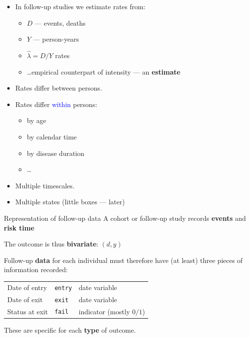 

\begin{frame}[fragile]%
  \begin{itemize}[<+->]
  \item In follow-up studies we estimate rates from:

    \begin{itemize}[<+->]
    \item $D$ --- events, deaths
    \item $Y$ --- person-years
    \item $\hat\lambda = D/Y$ rates
    \item \ldots empirical counterpart of intensity --- an \textbf{estimate}
    \end{itemize}

  \item Rates differ between persons.
  \item Rates differ \textcolor{blue}{within} persons:

    \begin{itemize}[<+->]
    \item by age
    \item by calendar time
    \item by disease duration
    \item \ldots
    \end{itemize}

  \item Multiple timescales.
  \item Multiple states (little boxes --- later)
  \end{itemize}

\end{frame}

\begin{frame}[fragile]{Representation of follow-up data}
A cohort or follow-up study records
\textbf{events} and \textbf{risk time}

The outcome is thus \textbf{bivariate}: $(d,y)$

Follow-up \textbf{data} for each individual must therefore have (at
least) three pieces of information recorded:
\begin{center}
\begin{tabular}{lll}
\toprule
Date of entry  & \verb+entry+ & date variable\\
Date of exit   & \verb+exit+  & date variable\\
Status at exit & \verb+fail+  & indicator (mostly $0/1$)\\
\bottomrule
\end{tabular}
\end{center}
These are specific for each \textbf{type} of outcome.

\end{frame}

